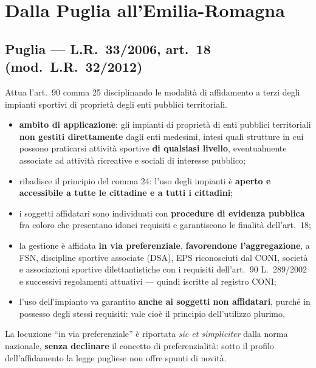 
\section{Dalla Puglia all'Emilia-Romagna}

\subsection{Puglia --- L.R.\ 33/2006, art.\ 18 (mod.\ L.R.\ 32/2012)}

Attua l'art.\ 90 comma 25 disciplinando le modalità di affidamento a terzi degli impianti sportivi
di proprietà degli enti pubblici territoriali.

\begin{itemize}
  \item \textbf{ambito di applicazione}: gli impianti di proprietà di enti pubblici territoriali
    \textbf{non gestiti direttamente} dagli enti medesimi, intesi quali strutture in cui possono
    praticarsi attività sportive \textbf{di qualsiasi livello}, eventualmente associate ad attività
    ricreative e sociali di interesse pubblico;
  \item ribadisce il principio del comma 24: l'uso degli impianti è \textbf{aperto e accessibile a
    tutte le cittadine e a tutti i cittadini};
  \item i soggetti affidatari sono individuati con \textbf{procedure di evidenza pubblica} fra
    coloro che presentano idonei requisiti e garantiscono le finalità dell'art.\ 18;
  \item la gestione è affidata \textbf{in via preferenziale}, \textbf{favorendone l'aggregazione},
    a FSN, discipline sportive associate (DSA), EPS riconosciuti dal CONI, società e associazioni
    sportive dilettantistiche con i requisiti dell'art.\ 90 L.\ 289/2002 e successivi regolamenti
    attuativi --- quindi iscritte al registro CONI;
  \item l'uso dell'impianto va garantito \textbf{anche ai soggetti non affidatari}, purché in
    possesso degli stessi requisiti: vale cioè il principio dell'utilizzo plurimo.
\end{itemize}

La locuzione ``in via preferenziale'' è riportata \textit{sic et simpliciter} dalla norma
nazionale, \textbf{senza declinare} il concetto di preferenzialità: sotto il profilo
dell'affidamento la legge pugliese non offre spunti di novità.

